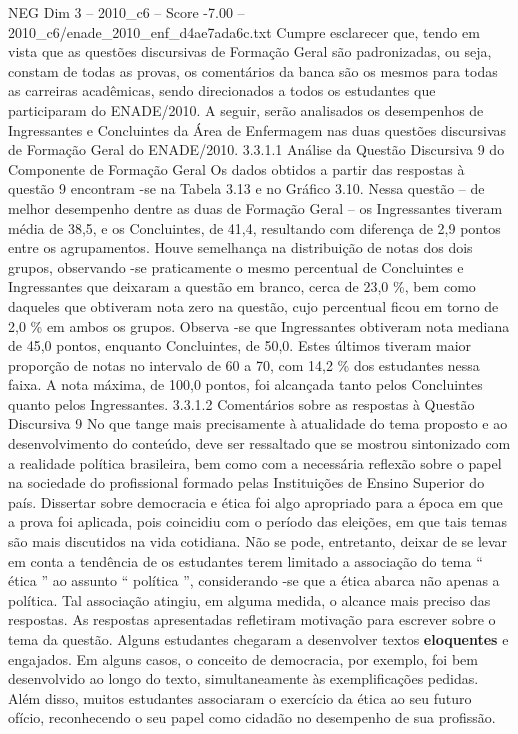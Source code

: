 \begin{textsample}{NEG Dim 3 – 2010\_c6 – Score -7.00 – 2010\_c6/enade\_2010\_enf\_d4ae7ada6c.txt}
Cumpre esclarecer que, tendo em vista que as questões discursivas de Formação Geral são padronizadas, ou seja, constam de todas as provas, os comentários da banca são os mesmos para todas as carreiras acadêmicas, sendo direcionados a todos os estudantes que participaram do ENADE/2010.
A seguir, serão analisados os desempenhos de Ingressantes e Concluintes da Área de Enfermagem nas duas questões discursivas de Formação Geral do ENADE/2010. 3.3.1.1 Análise da Questão Discursiva 9 do Componente de Formação Geral Os dados obtidos a partir das respostas à questão 9 encontram -se na Tabela 3.13 e no Gráfico 3.10.
Nessa questão – de melhor desempenho dentre as duas de Formação Geral – os Ingressantes tiveram média de 38,5, e os Concluintes, de 41,4, resultando com diferença de 2,9 pontos entre os agrupamentos.
Houve semelhança na distribuição de notas dos dois grupos, observando -se praticamente o mesmo percentual de Concluintes e Ingressantes que deixaram a questão em branco, cerca de 23,0 \%, bem como daqueles que obtiveram nota zero na questão, cujo percentual ficou em torno de 2,0 \% em ambos os grupos.
Observa -se que Ingressantes obtiveram nota mediana de 45,0 pontos, enquanto Concluintes, de 50,0.
Estes últimos tiveram maior proporção de notas no intervalo de 60 a 70, com 14,2 \% dos estudantes nessa faixa.
A nota máxima, de 100,0 pontos, foi alcançada tanto pelos Concluintes quanto pelos Ingressantes. 3.3.1.2 Comentários sobre as respostas à Questão Discursiva 9 No que tange mais precisamente à atualidade do tema proposto e ao desenvolvimento do conteúdo, deve ser ressaltado que se mostrou sintonizado com a realidade política brasileira, bem como com a necessária reflexão sobre o papel na sociedade do profissional formado pelas Instituições de Ensino Superior do país.
Dissertar sobre democracia e ética foi algo apropriado para a época em que a prova foi aplicada, pois coincidiu com o período das eleições, em que tais temas são mais discutidos na vida cotidiana.
Não se pode, entretanto, deixar de se levar em conta a tendência de os estudantes terem limitado a associação do tema “ ética ” ao assunto “ política ”, considerando -se que a ética abarca não apenas a política.
Tal associação atingiu, em alguma medida, o alcance mais preciso das respostas.
As respostas apresentadas refletiram motivação para escrever sobre o tema da questão.
Alguns estudantes chegaram a desenvolver textos \textbf{eloquentes} e engajados.
Em alguns casos, o conceito de democracia, por exemplo, foi bem desenvolvido ao longo do texto, simultaneamente às exemplificações pedidas.
Além disso, muitos estudantes associaram o exercício da ética ao seu futuro ofício, reconhecendo o seu papel como cidadão no desempenho de sua profissão.

\end{textsample}
